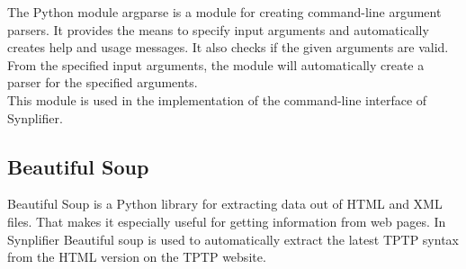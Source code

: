 The Python module argparse is a module for creating command-line argument parsers.
It provides the means to specify input arguments and automatically creates help and usage messages.
It also checks if the given arguments are valid.
From the specified input arguments, the module will automatically create a parser for the specified arguments. \cite{argparse}\\
This module is used in the implementation of the command-line interface of \ac{Synplifier}.

\subsection{Beautiful Soup}\label{sec:BackgroundBeautifulSoup}

Beautiful Soup is a Python library for extracting data out of HTML and XML files.
That makes it especially useful for getting information from web pages. \cite{BeautifulSoup,BeautifulSoupDoku}
In \ac{Synplifier} Beautiful soup is used to automatically extract the latest \ac{TPTP} syntax from the HTML version on the \ac{TPTP} website.
